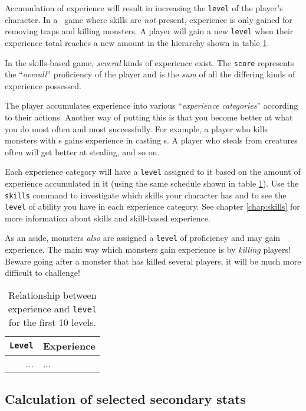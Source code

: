 Accumulation of experience will result in increasing the {\tt level} of the 
player's character. In a \cf\ game where skills are {\em not} present, 
experience is only gained for removing traps and killing monsters.
A player will gain a new {\tt level} when their 
experience total reaches a new amount in the hierarchy shown
in table \ref{tab:exp_level}. 

In the skills-based game, {\em several} kinds of experience exist. The 
{\tt score} represents the ``{\em overall}'' proficiency of the player 
and is the 
{\em sum} of all the differing kinds of experience possessed.

The player accumulates experience into various ``{\em experience 
categories}'' according to their actions.
Another way of putting this is that you become better
at what you do most often and most successfully. For example,
a player who kills monsters with \incantation s gains experience in 
casting \incantation s. A player who steals from creatures often will
get better at stealing, and so on.  

Each experience category will have a {\tt level} assigned to it based on 
the amount of experience accumulated in it (using the same schedule
 shown in table 
\ref{tab:exp_level}). Use the {\tt skills} command to 
investigate which skills your character has and to see the {\tt level} of 
ability you have in each experience category. See chapter 
\ref{chap:skills} for more information about skills and skill-based
experience.

As an aside, monsters {\em also} are assigned a {\tt level} of proficiency
and may gain experience. The main way which monsters gain experience
is by {\em killing} players! Beware going after a monster that has
killed several players, it will be much more difficult to challenge!

\begin{table}
\begin{center}
\caption{Relationship between experience and {\tt level} for the first 
10 levels. \label{tab:exp_level}}
\vskip 12pt
\small
\begin{tabular}{|rl|}
\hline
{\tt Level}	& \multicolumn{1}{c|}{Experience} \\ \hline\hline 

... & ... \\
\hline
\end{tabular}
\end{center}
\end{table}
 
\subsection{Calculation of selected secondary stats}\label{sec:stat_calc} 

